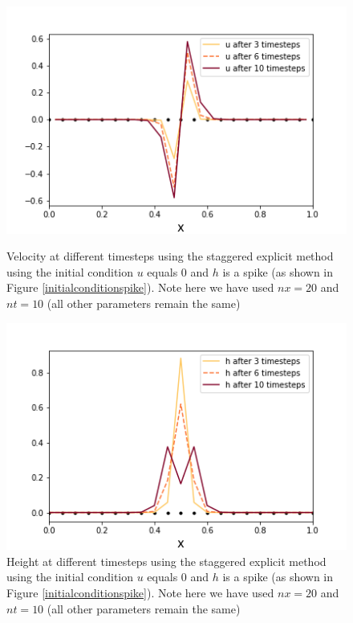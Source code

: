 \documentclass[a4paper,12pt, notitlepage]{article}
\begin{document}
{\begin{figure} [H]
	\begin{minipage}{.5\textwidth}
		\ContinuedFloat*
		\captionsetup{width=0.9\textwidth}
		\captionsetup{justification=centering}
		\includegraphics[width=\textwidth]{velocity_staggered_explicit_spike.png}
		\caption{\label{velocity_staggered_explicit_spike} Velocity at different timesteps using the staggered explicit method using the initial condition $u$ equals 0 and $h$ is a spike (as shown in Figure \ref{initialconditionspike}). Note here we have used $nx = 20$ and $nt = 10$ (all other parameters remain the same)} 
	\end{minipage}
	\begin{minipage}{.5\textwidth}
		\ContinuedFloat
		\captionsetup{width=0.9\textwidth}
		\captionsetup{justification=centering}
		\includegraphics[width=\textwidth]{height_staggered_explicit_spike.png}
		\caption{\label{height_staggered_explicit_spike} Height at different timesteps using the staggered explicit method using the initial condition $u$ equals 0 and $h$ is a spike (as shown in Figure \ref{initialconditionspike}). Note here we have used $nx = 20$ and $nt = 10$ (all other parameters remain the same)} 
	\end{minipage}
\end{figure}

}
\end{document}
